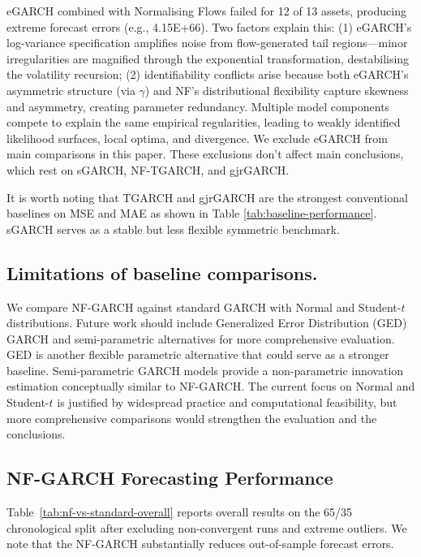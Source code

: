 \documentclass[risks,article,submit,pdftex,moreauthors]{Definitions/mdpi}
\begin{document}
eGARCH combined with Normalising Flows failed for 12 of 13 assets, producing extreme forecast errors (e.g., 4.15E+66). Two factors explain this: (1) eGARCH's log-variance specification amplifies noise from flow-generated tail regions—minor irregularities are magnified through the exponential transformation, destabilising the volatility recursion; (2) identifiability conflicts arise because both eGARCH's asymmetric structure (via $\gamma$) and NF's distributional flexibility capture skewness and asymmetry, creating parameter redundancy. Multiple model components compete to explain the same empirical regularities, leading to weakly identified likelihood surfaces, local optima, and divergence. We exclude eGARCH from main comparisons in this paper. These exclusions don't affect main conclusions, which rest on sGARCH, NF-TGARCH, and gjrGARCH.

It is worth noting that TGARCH and gjrGARCH are the strongest conventional baselines on MSE and MAE as shown in Table \ref{tab:baseline-performance}. sGARCH serves as a stable but less flexible symmetric benchmark. 


\subsection{Limitations of baseline comparisons.}
We compare NF-GARCH against standard GARCH with Normal and Student-$t$ distributions. Future work should include Generalized Error Distribution (GED) GARCH and semi-parametric alternatives \citep{engle1993measuring} for more comprehensive evaluation. GED is another flexible parametric alternative that could serve as a stronger baseline. Semi-parametric GARCH models \citep{engle1993measuring, hansen1994autoregressive} provide a non-parametric innovation estimation conceptually similar to NF-GARCH. The current focus on Normal and Student-$t$ is justified by widespread practice and computational feasibility, but more comprehensive comparisons would strengthen the evaluation and the conclusions.

\subsection{NF-GARCH Forecasting Performance}
\label{sec:nf_forecast_results}

Table~\ref{tab:nf-vs-standard-overall} reports overall results on the 65/35 chronological split after excluding non-convergent runs and extreme outliers. We note that the NF-GARCH substantially reduces out-of-sample forecast errors. 
\end{document}
